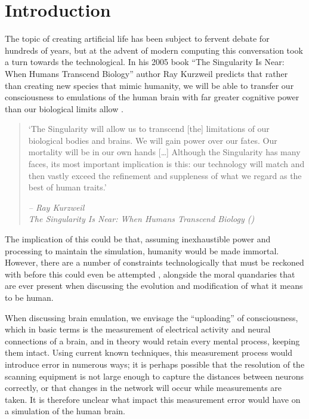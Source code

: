 \chapter{Introduction}


The topic of creating artificial life has been subject to fervent debate for
hundreds of years, but at the advent of modern computing this conversation took
a turn towards the technological. In his 2005 book “The Singularity Is Near:
When Humans Transcend Biology” author Ray Kurzweil predicts that rather than
creating new species that mimic humanity, we will be able to transfer our
consciousness to emulations of the human brain with far greater cognitive power
than our biological limits allow \autocite{kurzweil_singularity_2006}.

\begin{quote}
      `The Singularity will allow us to transcend [the] limitations of our
      biological bodies and brains. We will gain power over our fates. Our
      mortality will be in our own hands [\ldots] Although the Singularity has
      many faces, its most important implication is this: our technology will
      match and then vastly exceed the refinement and suppleness of what we
      regard as the best of human traits.'
\begin{flushright}
      \textit{-- Ray Kurzweil \\ The Singularity Is Near: When Humans Transcend
      Biology (\citeyear{kurzweil_singularity_2006})}
  \end{flushright}
\end{quote}  

The implication of this could be that, assuming inexhaustible power and
processing to maintain the simulation, humanity would be made immortal. However,
there are a number of constraints technologically that must be reckoned with
before this could even be attempted \parencite{bostrom_whole_2008}, alongside
the moral quandaries that are ever present when discussing the evolution and
modification of what it means to be human.

When discussing brain emulation, we envisage the “uploading” of consciousness,
which in basic terms is the measurement of electrical activity and neural
connections of a brain, and in theory would retain every mental process, keeping
them intact. Using current known techniques, this measurement process would
introduce error in numerous ways; it is perhaps possible that the resolution of
the scanning equipment is not large enough to capture the distances between
neurons correctly, or that changes in the network will occur while measurements
are taken. It is therefore unclear what impact this measurement error would have
on a simulation of the human brain.


